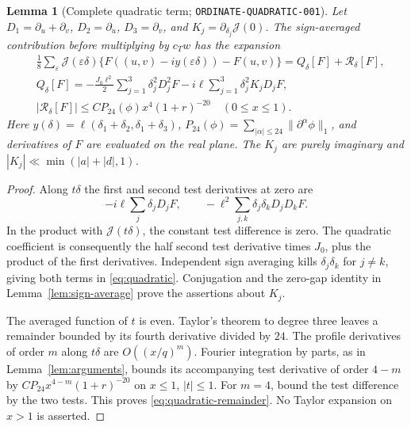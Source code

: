 \documentclass[11pt]{article}
\newtheorem{lemma}{Lemma}
\begin{document}
\begin{lemma}[Complete quadratic term; \texttt{ORDINATE-QUADRATIC-001}]
\label{lem:quadratic}
Let $D_1=\partial_u+\partial_v$, $D_2=\partial_u$, $D_3=\partial_v$,
and $K_j=\partial_{\delta_j}\mathcal J(0)$. The sign-averaged contribution
before multiplying by $c_Tw$ has the expansion
\begin{align}
 &\frac18\sum_\varepsilon\mathcal J(\varepsilon\delta)
       \{F((u,v)-iy(\varepsilon\delta))-F(u,v)\}
       =Q_\delta[F]+\mathcal R_\delta[F],\label{eq:quadratic-expansion}\\
 &Q_\delta[F]= -\frac{J_0\ell^2}{2}\sum_{j=1}^3\delta_j^2D_j^2F
                 -i\ell\sum_{j=1}^3\delta_j^2K_jD_jF,\label{eq:quadratic}\\
 &|\mathcal R_\delta[F]|\leq C P_{24}(\phi)x^4(1+r)^{-20}
                         \quad(0\leq x\leq1).\label{eq:quadratic-remainder}
\end{align}
Here $y(\delta)=\ell(\delta_1+\delta_2,\delta_1+\delta_3)$,
$P_{24}(\phi)=\sum_{|\alpha|\leq24}\|\partial^\alpha\phi\|_1$,
and derivatives of $F$ are evaluated on the real plane. The $K_j$ are
purely imaginary and $|K_j|\ll\min(|a|+|d|,1)$.
\end{lemma}
\begin{proof}
Along $t\delta$ the first and second test derivatives at zero are
\[
-i\ell\sum_j\delta_jD_jF,\qquad
-\ell^2\sum_{j,k}\delta_j\delta_kD_jD_kF.
\]
In the product with $\mathcal J(t\delta)$, the constant test difference
is zero. The quadratic coefficient is consequently the half second test
derivative times $J_0$, plus the product of the first derivatives.
Independent sign averaging kills $\delta_j\delta_k$ for $j\ne k$,
giving both terms in \eqref{eq:quadratic}. Conjugation and the zero-gap
identity in Lemma~\ref{lem:sign-average} prove the assertions about $K_j$.

The averaged function of $t$ is even. Taylor's theorem to degree three
leaves a remainder bounded by its fourth derivative divided by $24$.
The profile derivatives of order $m$ along $t\delta$ are $O((x/q)^m)$.
Fourier integration by parts, as in Lemma~\ref{lem:arguments}, bounds
its accompanying test derivative of order $4-m$ by
$CP_{24}x^{4-m}(1+r)^{-20}$ on $x\leq1$, $|t|\leq1$.
For $m=4$, bound the test difference by the two tests. This proves
\eqref{eq:quadratic-remainder}. No Taylor expansion on $x>1$ is asserted.
\end{proof}
\end{document}
